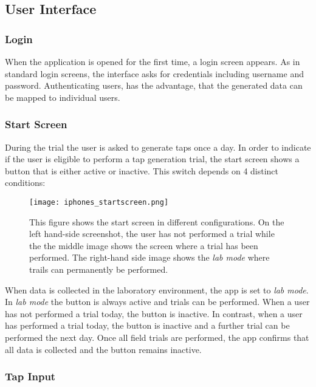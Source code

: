 \label{sec:mobileapp}

\subsection{User Interface}
\subsubsection{Login}
When the application is opened for the first time, a login screen appears. As in standard login screens, the interface asks for credentials including username and password. Authenticating users, has the advantage, that the generated data can be mapped to individual users.


\subsubsection{Start Screen}
During the trial the user is asked to generate taps once a day. In order to indicate if the user is eligible to perform a tap generation trial, the start screen shows a button that is either active or inactive. This switch depends on 4 distinct conditions: \\

\begin{figure}[h!]
  \centering
  \texttt{[image: iphones\_startscreen.png]}
  \caption{This figure shows the start screen in different configurations. On the left hand-side screenshot, the user has not performed a trial while the the middle image shows the screen where a trial has been performed. The right-hand side image shows the \textit{lab mode} where trails can permanently be performed.}
\end{figure}

When data is collected in the laboratory environment, the app is set to \textit{lab mode}. In \textit{lab mode} the button is always active and trials can be performed. When a user has not performed a trial today, the button is inactive. In contrast, when a user has performed a trial today, the button is inactive and a further trial can be performed the next day. Once all field trials are performed, the app confirms that all data is collected and the button remains inactive.

\subsubsection{Tap Input}

